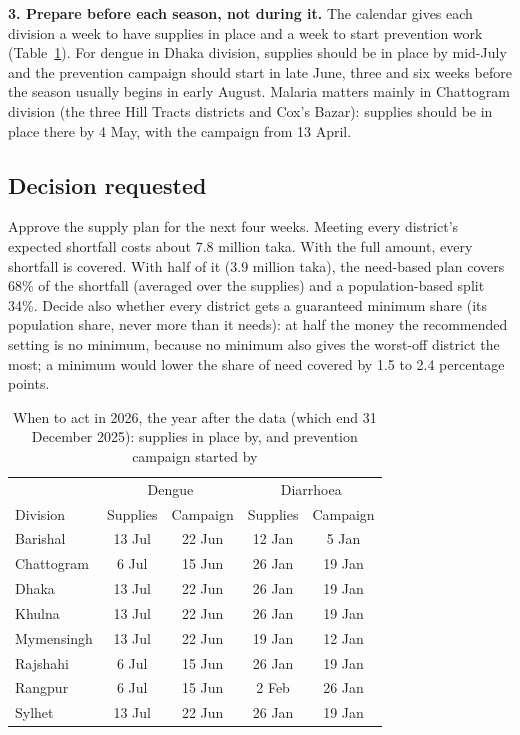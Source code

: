 \textbf{3. Prepare before each season, not during it.} The calendar gives each division a week to have supplies
in place and a week to start prevention work (Table~\ref{tab:brief-calendar}). For dengue in Dhaka division, supplies should be in place by
mid-July and the prevention campaign should start in late June, three and six weeks before the season usually
begins in early August. Malaria matters mainly in Chattogram division (the three Hill Tracts districts and Cox's Bazar): supplies
should be in place there by 4 May, with the campaign from 13 April.

\subsection*{Decision requested}
Approve the supply plan for the next four weeks. Meeting every district's expected shortfall costs about
7.8 million taka. With the full amount, every shortfall is covered. With half of it (3.9 million taka), the
need-based plan covers 68\% of the shortfall (averaged over the supplies) and a population-based split 34\%. Decide also whether
every district gets a guaranteed minimum share (its population share, never more than it needs): at half the
money the recommended setting is no minimum, because no minimum also gives the worst-off district the most; a
minimum would lower the share of need covered by 1.5 to 2.4 percentage points.

\begin{table}[htbp]
\caption{When to act in 2026, the year after the data (which end 31 December 2025): supplies in place by, and prevention campaign started by}
\label{tab:brief-calendar}
\centering\footnotesize
\setlength{\tabcolsep}{3pt}
\begin{tabular}{@{}lcccc@{}}
\toprule
 & \multicolumn{2}{c}{Dengue} & \multicolumn{2}{c}{Diarrhoea} \\
Division & Supplies & Campaign & Supplies & Campaign \\
\midrule
Barishal & 13 Jul & 22 Jun & 12 Jan & 5 Jan \\
Chattogram & 6 Jul & 15 Jun & 26 Jan & 19 Jan \\
Dhaka & 13 Jul & 22 Jun & 26 Jan & 19 Jan \\
Khulna & 13 Jul & 22 Jun & 26 Jan & 19 Jan \\
Mymensingh & 13 Jul & 22 Jun & 19 Jan & 12 Jan \\
Rajshahi & 6 Jul & 15 Jun & 26 Jan & 19 Jan \\
Rangpur & 6 Jul & 15 Jun & 2 Feb & 26 Jan \\
Sylhet & 13 Jul & 22 Jun & 26 Jan & 19 Jan \\
\bottomrule
\end{tabular}
\end{table}

